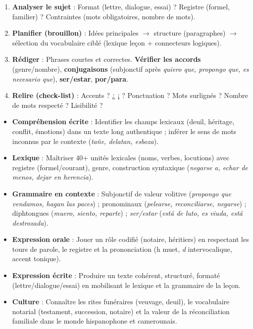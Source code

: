 \documentclass[11pt]{article}
\begin{document}
\begin{methode}
\begin{enumerate}
\item \textbf{Analyser le sujet} : Format (lettre, dialogue, essai) ? Registre (formel, familier) ? Contraintes (mots obligatoires, nombre de mots).
\item \textbf{Planifier (brouillon)} : Idées principales $\to$ structure (paragraphes) $\to$ sélection du vocabulaire ciblé (lexique leçon + connecteurs logiques).
\item \textbf{Rédiger} : Phrases courtes et correctes. \textbf{Vérifier les accords} (genre/nombre), \textbf{conjugaisons} (subjonctif après \emph{quiero que, propongo que, es necesario que}), \textbf{ser/estar}, \textbf{por/para}.
\item \textbf{Relire (check-list)} : Accents ? ¿ ¡ ? Ponctuation ? Mots surlignés ? Nombre de mots respecté ? Lisibilité ?
\end{enumerate}
\end{methode}

\begin{aretenir}
\begin{itemize}
\item \textbf{Compréhension écrite} : Identifier les champs lexicaux (deuil, héritage, conflit, émotions) dans un texte long authentique ; inférer le sens de mots inconnus par le contexte (\emph{tañe, delatan, esboza}).
\item \textbf{Lexique} : Maîtriser 40+ unités lexicales (noms, verbes, locutions) avec registre (formel/courant), genre, construction syntaxique (\emph{negarse a, echar de menos, dejar en herencia}).
\item \textbf{Grammaire en contexte} : Subjonctif de valeur volitive (\emph{propongo que vendamos, hagan las paces}) ; pronominaux (\emph{pelearse, reconciliarse, negarse}) ; diphtongues (\emph{muero, siento, reparte}) ; \emph{ser/estar} (\emph{está de luto, es viuda, está destrozada}).
\item \textbf{Expression orale} : Jouer un rôle codifié (notaire, héritiers) en respectant les tours de parole, le registre et la prononciation (h muet, \emph{d} intervocalique, accent tonique).
\item \textbf{Expression écrite} : Produire un texte cohérent, structuré, formaté (lettre/dialogue/essai) en mobilisant le lexique et la grammaire de la leçon.
\item \textbf{Culture} : Connaître les rites funéraires (veuvage, deuil), le vocabulaire notarial (testament, succession, notaire) et la valeur de la réconciliation familiale dans le monde hispanophone et camerounais.
\end{itemize}
\end{aretenir}
\end{document}
